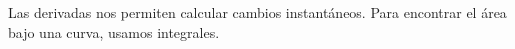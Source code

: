 \documentclass[preview]{standalone}
\begin{document}
\begin{center}
Las derivadas nos permiten calcular cambios instantáneos. Para encontrar el área bajo una curva, usamos integrales.
\end{center}
\end{document}
